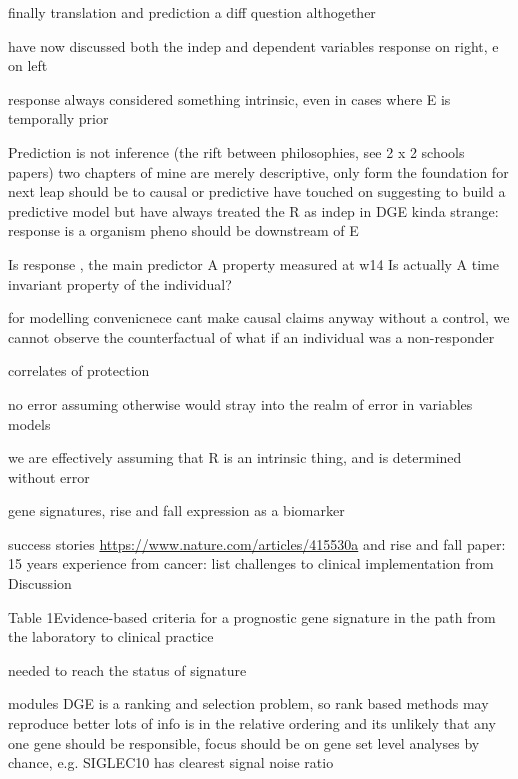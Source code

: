\begin{outline}
finally translation and prediction
    a diff question althogether

    have now discussed both the indep and dependent variables
    response on right, e on left

    response always considered something intrinsic, even in cases where E is temporally prior

    Prediction is not inference (the rift between philosophies, see 2 x 2 schools papers)
        two chapters of mine are merely descriptive, only form the foundation for next leap should be to causal or predictive
            have touched on suggesting to build a predictive model
        but have always treated the R as indep in DGE
        kinda strange: response is a organism pheno should be downstream of E

            Is response , the main predictor
            A property measured at w14
            Is actually A time invariant property of the individual?

            for modelling convenicnece
            cant make causal claims anyway
                without a control, we cannot observe the counterfactual of what if an individual was a non-responder

            correlates of protection

            no error
                assuming otherwise would stray into the realm of error in variables models
            
                we are effectively assuming that R is an intrinsic thing, and is determined without error

        gene signatures, rise and fall
            expression as a biomarker

            success stories \url{https://www.nature.com/articles/415530a} 
            and
            rise and fall paper: 15 years experience from cancer: list challenges to clinical implementation from Discussion

            Table 1Evidence-based criteria for a prognostic gene signature in the path from the laboratory to clinical practice

        needed to reach the status of signature

    modules
        DGE is a ranking and selection problem, so rank based methods may reproduce better
        lots of info is in the relative ordering
        and its unlikely that any one gene should be responsible, focus should be on gene set level analyses
        by chance, e.g. SIGLEC10 has clearest signal noise ratio
        

\end{outline}
